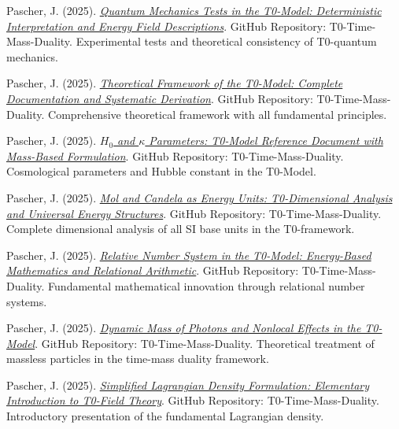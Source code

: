 \documentclass[12pt,a4paper]{report}
\begin{document}
\begin{thebibliography}{50}
		Pascher, J. (2025). \href{https://github.com/jpascher/T0-Time-Mass-Duality/blob/main/2/pdf/QM-testingEn.pdf}{\textit{Quantum Mechanics Tests in the T0-Model: Deterministic Interpretation and Energy Field Descriptions}}. GitHub Repository: T0-Time-Mass-Duality. Experimental tests and theoretical consistency of T0-quantum mechanics.
		
		Pascher, J. (2025). \href{https://github.com/jpascher/T0-Time-Mass-Duality/blob/main/2/pdf/HdocumentEn.pdf}{\textit{Theoretical Framework of the T0-Model: Complete Documentation and Systematic Derivation}}. GitHub Repository: T0-Time-Mass-Duality. Comprehensive theoretical framework with all fundamental principles.
		
		Pascher, J. (2025). \href{https://github.com/jpascher/T0-Time-Mass-Duality/blob/main/2/pdf/Ho_En.pdf}{\textit{$H_0$ and $\kappa$ Parameters: T0-Model Reference Document with Mass-Based Formulation}}. GitHub Repository: T0-Time-Mass-Duality. Cosmological parameters and Hubble constant in the T0-Model.
		
		Pascher, J. (2025). \href{https://github.com/jpascher/T0-Time-Mass-Duality/blob/main/2/pdf/Mol_CandelaEn.pdf}{\textit{Mol and Candela as Energy Units: T0-Dimensional Analysis and Universal Energy Structures}}. GitHub Repository: T0-Time-Mass-Duality. Complete dimensional analysis of all SI base units in the T0-framework.
		
		Pascher, J. (2025). \href{https://github.com/jpascher/T0-Time-Mass-Duality/blob/main/2/pdf/RelativeNumberSystemEn.pdf}{\textit{Relative Number System in the T0-Model: Energy-Based Mathematics and Relational Arithmetic}}. GitHub Repository: T0-Time-Mass-Duality. Fundamental mathematical innovation through relational number systems.
		
		Pascher, J. (2025). \href{https://github.com/jpascher/T0-Time-Mass-Duality/blob/main/2/pdf/DynMassPhotonsNonlocalEn.pdf}{\textit{Dynamic Mass of Photons and Nonlocal Effects in the T0-Model}}. GitHub Repository: T0-Time-Mass-Duality. Theoretical treatment of massless particles in the time-mass duality framework.
		
		Pascher, J. (2025). \href{https://github.com/jpascher/T0-Time-Mass-Duality/blob/main/2/pdf/lagrangian-simpleEn.pdf}{\textit{Simplified Lagrangian Density Formulation: Elementary Introduction to T0-Field Theory}}. GitHub Repository: T0-Time-Mass-Duality. Introductory presentation of the fundamental Lagrangian density.
		

\end{thebibliography}
\end{document}
